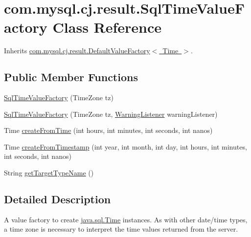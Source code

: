 \hypertarget{classcom_1_1mysql_1_1cj_1_1result_1_1_sql_time_value_factory}{}\section{com.\+mysql.\+cj.\+result.\+Sql\+Time\+Value\+Factory Class Reference}
\label{classcom_1_1mysql_1_1cj_1_1result_1_1_sql_time_value_factory}


Inherits \mbox{\hyperlink{classcom_1_1mysql_1_1cj_1_1result_1_1_default_value_factory}{com.\+mysql.\+cj.\+result.\+Default\+Value\+Factory$<$ Time $>$}}.

\subsection*{Public Member Functions}
\begin{DoxyCompactItemize}
\item 
\mbox{\hyperlink{classcom_1_1mysql_1_1cj_1_1result_1_1_sql_time_value_factory_a579f6918213606b00ac7dff75b65bf1d}{Sql\+Time\+Value\+Factory}} (Time\+Zone tz)
\item 
\mbox{\hyperlink{classcom_1_1mysql_1_1cj_1_1result_1_1_sql_time_value_factory_a93d3991aa6d656e64fdd729e6b1435a5}{Sql\+Time\+Value\+Factory}} (Time\+Zone tz, \mbox{\hyperlink{interfacecom_1_1mysql_1_1cj_1_1_warning_listener}{Warning\+Listener}} warning\+Listener)
\item 
Time \mbox{\hyperlink{classcom_1_1mysql_1_1cj_1_1result_1_1_sql_time_value_factory_aabc4ca0ed309a3a9ec1fe0845fc0c39e}{create\+From\+Time}} (int hours, int minutes, int seconds, int nanos)
\item 
Time \mbox{\hyperlink{classcom_1_1mysql_1_1cj_1_1result_1_1_sql_time_value_factory_a7778ade1a265bbd2f6b8fec881f5a5d0}{create\+From\+Timestamp}} (int year, int month, int day, int hours, int minutes, int seconds, int nanos)
\item 
String \mbox{\hyperlink{classcom_1_1mysql_1_1cj_1_1result_1_1_sql_time_value_factory_aff24d902b1037965e047b844ded455ca}{get\+Target\+Type\+Name}} ()
\end{DoxyCompactItemize}


\subsection{Detailed Description}
A value factory to create \mbox{\hyperlink{}{java.\+sql.\+Time}} instances. As with other date/time types, a time zone is necessary to interpret the time values returned from the server. 

